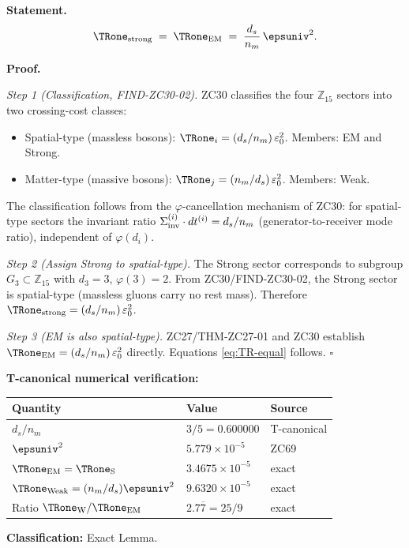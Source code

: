 \documentclass[12pt, a4paper]{article}
\begin{document}

\begin{formalbox}[title={LEM-ZC81-01: $\TRone_{\rm strong}
  = \TRone_{\rm EM}$ ($R_0$, Exact)}]

\textbf{Statement.}
\begin{equation}
  \TRone_{\rm strong}
  \;=\; \TRone_{\rm EM}
  \;=\; \frac{d_s}{n_m}\,\epsuniv^2.
  \label{eq:TR-equal}
\end{equation}

\textbf{Proof.}

\textit{Step 1 (Classification, FIND-ZC30-02).}
ZC30 classifies the four $\mathbb{Z}_{15}$ sectors into two
crossing-cost classes:
\begin{itemize}[leftmargin=2em, noitemsep]
  \item Spatial-type (massless bosons):
    $\TRone_i = (d_s/n_m)\,\varepsilon_0^2$.
    Members: EM and Strong.
  \item Matter-type (massive bosons):
    $\TRone_j = (n_m/d_s)\,\varepsilon_0^2$.
    Members: Weak.
\end{itemize}
The classification follows from the $\varphi$-cancellation
mechanism of ZC30: for spatial-type sectors the invariant
ratio $\Sigma_{\rm inv}^{(i)}\cdot dt^{(i)} = d_s/n_m$
(generator-to-receiver mode ratio), independent of $\varphi(d_i)$.

\textit{Step 2 (Assign Strong to spatial-type).}
The Strong sector corresponds to subgroup $G_3 \subset \mathbb{Z}_{15}$
with $d_3 = 3$, $\varphi(3) = 2$. From ZC30/FIND-ZC30-02, the
Strong sector is spatial-type (massless gluons carry no rest mass).
Therefore $\TRone_{\rm strong} = (d_s/n_m)\,\varepsilon_0^2$.

\textit{Step 3 (EM is also spatial-type).}
ZC27/THM-ZC27-01 and ZC30 establish $\TRone_{\rm EM} =
(d_s/n_m)\,\varepsilon_0^2$ directly. Equations
\eqref{eq:TR-equal} follows. \hfill$\square$

\textbf{T-canonical numerical verification:}
\begin{center}
{\small\renewcommand{\arraystretch}{1.25}
\begin{tabular}{@{}p{5.8cm}p{2.6cm}l@{}}
\toprule
Quantity & Value & Source \\
\midrule
$d_s/n_m$                           & $3/5 = 0.600000$ & T-canonical \\
$\epsuniv^2$                        & $5.779\times10^{-5}$ & ZC69 \\
$\TRone_{\rm EM} = \TRone_{\rm S}$  & $3.4675\times10^{-5}$ & exact \\
$\TRone_{\rm Weak} = (n_m/d_s)\epsuniv^2$ & $9.6320\times10^{-5}$ & exact \\
Ratio $\TRone_{\rm W}/\TRone_{\rm EM}$ & $2.7\overline{7} = 25/9$ & exact \\
\bottomrule
\end{tabular}}
\end{center}

\textbf{Classification:} Exact Lemma.
\end{formalbox}
\end{document}

